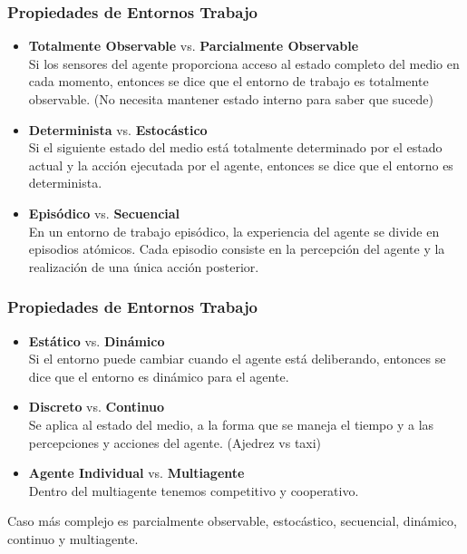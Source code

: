 \documentclass{beamer}
\begin{document}
\begin{frame}\frametitle{Propiedades de Entornos Trabajo} \footnotesize  
 
\begin{itemize}
\item \textbf{Totalmente Observable} vs.  \textbf{Parcialmente Observable}\\
Si los sensores del agente proporciona acceso al estado completo del medio en cada momento, entonces se dice que el entorno de trabajo es totalmente observable. (No necesita mantener estado interno para saber que sucede)

\item \textbf{Determinista} vs.  \textbf{Estocástico}\\
Si el siguiente estado del medio está totalmente determinado por el estado actual y la acción ejecutada por el agente, entonces se dice que el entorno es determinista.

\item \textbf{Episódico} vs.  \textbf{Secuencial}\\
En un entorno de trabajo episódico, la experiencia del agente se divide en episodios atómicos. Cada episodio consiste en la percepción del agente y la realización de una única acción posterior.

\end{itemize}


\end{frame}
\begin{frame}\frametitle{Propiedades de Entornos Trabajo} \footnotesize  
 
\begin{itemize}
\item \textbf{Estático} vs.  \textbf{Dinámico}\\
Si el entorno puede cambiar cuando el agente está deliberando, entonces se dice que el entorno es dinámico para el agente.

\item \textbf{Discreto} vs.  \textbf{Continuo}\\
Se aplica al estado del medio, a la forma que se maneja el tiempo y a las percepciones y acciones del agente. (Ajedrez vs taxi)


\item \textbf{Agente Individual} vs.  \textbf{Multiagente}\\
Dentro del multiagente tenemos competitivo y cooperativo.
\end{itemize}

 \vspace*{0,4cm}

Caso más complejo es parcialmente observable, estocástico, secuencial, dinámico, continuo y multiagente. 
\end{frame}
\end{document}
